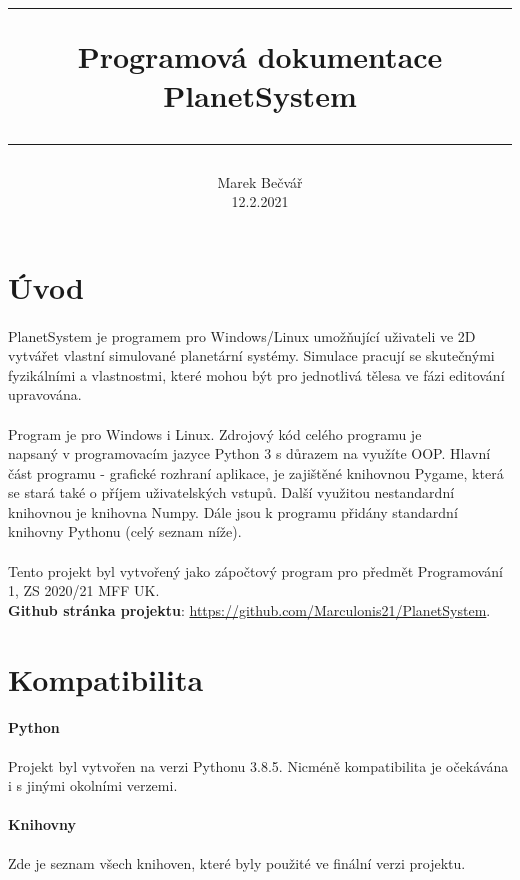 \documentclass[a4paper, 12pt]{article}
\title{
        \vspace{1in}
        \rule{\linewidth}{0.5pt}
		\usefont{OT1}{bch}{b}{n}
        \huge Programová dokumentace \\PlanetSystem\\
        \vspace{-10pt}
        \rule{\linewidth}{1pt}
}
\author{
		\normalfont\normalsize
        Marek Bečvář\\[-3pt]\normalsize
        12.2.2021
}
\date{}
\begin{document}
\maketitle 
\newpage

\tableofcontents
\newpage

\section{Úvod}
\paragraph{}
PlanetSystem je programem pro Windows/Linux umožňující uživateli ve 2D vytvářet
vlastní simulované planetární systémy. Simulace pracují se skutečnými
fyzikálními a vlastnostmi, které mohou být pro jednotlivá tělesa ve fázi
editování upravována.
\\\\
Program je pro Windows i Linux. Zdrojový kód celého programu je \\napsaný v
programovacím jazyce Python 3 s důrazem na využíte OOP.  Hlavní část programu -
grafické rozhraní aplikace, je zajištěné knihovnou Pygame, která se stará také
o příjem uživatelských vstupů. Další využitou nestandardní knihovnou je
knihovna Numpy. Dále jsou k programu přidány standardní knihovny Pythonu (celý
seznam níže).  
\\\\
Tento projekt byl vytvořený jako zápočtový program pro předmět Programování 1,
ZS 2020/21 MFF UK. 
\\
\textbf{Github stránka projektu}:
\url{https://github.com/Marculonis21/PlanetSystem}.

\section{Kompatibilita}
\paragraph{Python} Projekt byl vytvořen na verzi Pythonu 3.8.5. Nicméně
kompatibilita je očekávána i s jinými okolními verzemi. 

\paragraph{Knihovny} Zde je seznam všech knihoven, 
které byly použité ve finální verzi projektu.
\end{document}

